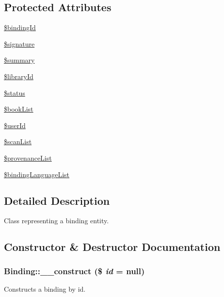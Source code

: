 \subsection*{Protected Attributes}
\begin{DoxyCompactItemize}
\item 
\hyperlink{classBinding_ac145987d9c0aca2442c63a92a085ef03}{\$bindingId}
\item 
\hyperlink{classBinding_a508680736126fbd926d7f6ba9aeed585}{\$signature}
\item 
\hyperlink{classBinding_ae960edd7ba2a427c3853936f0e1a380e}{\$summary}
\item 
\hyperlink{classBinding_a9e88a985a9d2097135f01ef49a1c3114}{\$libraryId}
\item 
\hyperlink{classBinding_a1320ef2d72d40ce811c675afc602929a}{\$status}
\item 
\hyperlink{classBinding_abf327f008d27256a4756e6e08819d87b}{\$bookList}
\item 
\hyperlink{classBinding_ab62d5639d1a6f658de8a5fda326cc30d}{\$userId}
\item 
\hyperlink{classBinding_a1ba6844e15978a1136a50632f30e29b6}{\$scanList}
\item 
\hyperlink{classBinding_a9f4c618edbd6df5e1972aae7350e37d4}{\$provenanceList}
\item 
\hyperlink{classBinding_a9ef17d4d6732c18b6a3ac4b48483ef90}{\$bindingLanguageList}
\end{DoxyCompactItemize}


\subsection{Detailed Description}
Class representing a binding entity. 

\subsection{Constructor \& Destructor Documentation}
\hypertarget{classBinding_a0abc79cbae099b6074a023de794ba7d6}{
\subsubsection[{\_\-\_\-construct}]{\setlength{\rightskip}{0pt plus 5cm}Binding::\_\-\_\-construct (\$ {\em id} = {\ttfamily null})}}
\label{classBinding_a0abc79cbae099b6074a023de794ba7d6}
Constructs a binding by id.


